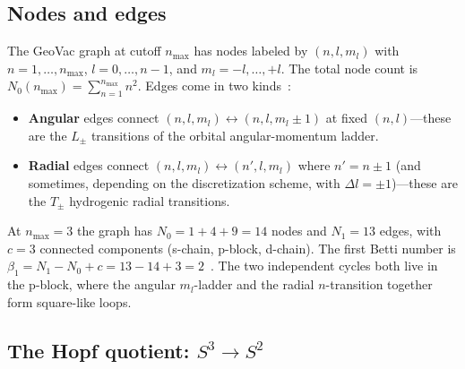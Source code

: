 \documentclass[aps,pra,twocolumn,superscriptaddress,longbibliography]{revtex4-2}
\begin{document}
\subsection{Nodes and edges}

The GeoVac graph at cutoff $n_{\max}$ has nodes labeled by
$(n, l, m_l)$ with $n = 1, \ldots, n_{\max}$, $l = 0, \ldots, n-1$,
and $m_l = -l, \ldots, +l$.  The total node count is
$N_0(n_{\max}) = \sum_{n=1}^{n_{\max}} n^2$.  Edges come in two
kinds~\cite{Paper7,Paper14}:
\begin{itemize}
\item \textbf{Angular} edges connect
  $(n, l, m_l) \leftrightarrow (n, l, m_l \pm 1)$ at fixed
  $(n, l)$---these are the $L_\pm$ transitions of the orbital
  angular-momentum ladder.
\item \textbf{Radial} edges connect
  $(n, l, m_l) \leftrightarrow (n', l, m_l)$ where $n' = n \pm 1$
  (and sometimes, depending on the discretization scheme, with
  $\Delta l = \pm 1$)---these are the $T_\pm$ hydrogenic radial
  transitions.
\end{itemize}
At $n_{\max} = 3$ the graph has $N_0 = 1 + 4 + 9 = 14$ nodes and
$N_1 = 13$ edges, with $c = 3$ connected components (s-chain,
p-block, d-chain).  The first Betti number is
$\beta_1 = N_1 - N_0 + c = 13 - 14 + 3 = 2$~\cite{Q1B}.  The two
independent cycles both live in the p-block, where the angular
$m_l$-ladder and the radial $n$-transition together form square-like
loops.

\subsection{The Hopf quotient: $S^3 \to S^2$}
\end{document}
